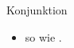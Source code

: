 \begin{syntax}{Konjunktion}{}
\begin{itemize}
	\item \fillhere so \fillhere wie \fillhere .
\end{itemize}
\end{syntax}
